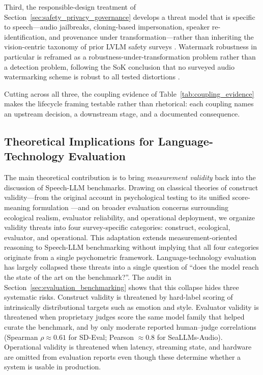 Third, the responsible-design treatment of
Section~\ref{sec:safety_privacy_governance} develops a threat model
that is specific to speech---audio jailbreaks, cloning-based
impersonation, speaker re-identification, and provenance under
transformation---rather than inheriting the vision-centric taxonomy of
prior LVLM safety surveys \citep{ye2024survey}. Watermark robustness in
particular is reframed as a robustness-under-transformation problem
rather than a detection problem, following the SoK conclusion that no
surveyed audio watermarking scheme is robust to all tested distortions
\citep{wen2025sokrobustaudiowatermarking}.

Cutting across all three, the coupling evidence of
Table~\ref{tab:coupling_evidence} makes the lifecycle framing testable
rather than rhetorical: each coupling names an upstream decision, a
downstream stage, and a documented consequence.

\subsection{Theoretical Implications for Language-Technology Evaluation}
\label{subsec:discussion_theoretical}

The main theoretical contribution is to bring \emph{measurement
validity} back into the discussion of Speech-LLM benchmarks. Drawing
on classical theories of construct validity---from the original
account in psychological testing \citep{cronbach1955construct} to its
unified score-meaning formulation \citep{messick1995validity}---and on
broader evaluation concerns surrounding ecological realism, evaluator
reliability, and operational deployment, we organize validity threats
into four survey-specific categories: construct, ecological,
evaluator, and operational. This adaptation extends
measurement-oriented reasoning to Speech-LLM benchmarking without
implying that all four categories originate from a single psychometric
framework. Language-technology evaluation has largely collapsed these
threats into a single question of
``does the model reach the state of the art on the benchmark?''. The
audit in Section~\ref{sec:evaluation_benchmarking} shows that this
collapse hides three systematic risks. Construct validity is
threatened by hard-label scoring of intrinsically distributional
targets such as emotion and style. Evaluator validity is threatened
when proprietary judges score the same model family that helped
curate the benchmark, and by only moderate reported human--judge
correlations (Spearman $\rho \approx 0.61$ for SD-Eval; Pearson $\approx
0.8$ for SeaLLMs-Audio). Operational validity is threatened when
latency, streaming state, and hardware are omitted from evaluation
reports even though these determine whether a system is usable in
production.

